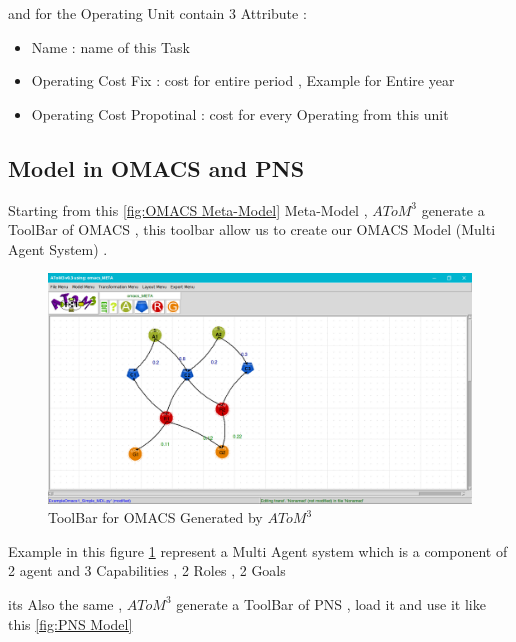 and for the Operating Unit contain 3 Attribute : 
\begin{itemize}

\item Name : name of this Task 
\item Operating Cost Fix  : cost for entire period ,  Example for Entire year
\item Operating Cost Propotinal  :  cost for every Operating from this unit

\end{itemize}

\pagebreak

\subsection{ Model in OMACS and PNS }

Starting from this  \ref{fig:OMACS Meta-Model} Meta-Model , $AToM^3$ generate a ToolBar of OMACS  , this toolbar allow us to create our OMACS Model (Multi Agent System) .
\vspace{0.1cm}
\begin{figure}[th]
	\centering
 	\includegraphics[scale=0.3]{Chapiter3/img/omacs_model}
	\caption{\label{fig:OMACS Model}ToolBar for OMACS Generated by $AToM^3$ }
\end{figure} 

Example in this figure \ref{fig:OMACS Model} represent a Multi Agent system which is  a component of 2 agent and 3 Capabilities , 2 Roles , 2 Goals
\vspace{0.1cm}


its Also the same  , $AToM^3$ generate a ToolBar of PNS , load it and use it like this \ref{fig:PNS Model}

